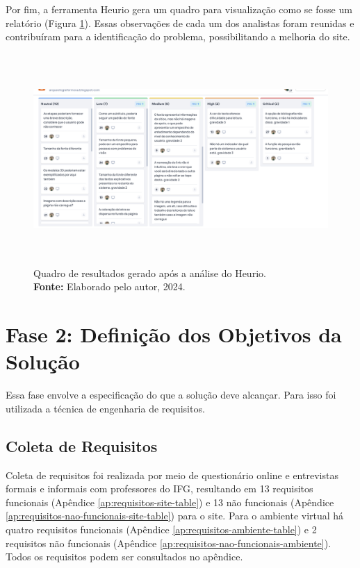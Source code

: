 Por fim, a ferramenta Heurio gera um quadro para visualização como se fosse um relatório (Figura \ref{fig:quadro resultados}). Essas observações de cada um dos analistas foram reunidas e contribuíram para a identificação do problema, possibilitando a melhoria do site. 
\begin{figure}[H]
    \centering
    \includegraphics[height=8cm, keepaspectratio]{img/heurio/quadro resultados.png}
    \caption{ Quadro de resultados gerado após a análise do Heurio. \\
        \textbf{Fonte:} Elaborado pelo autor, 2024.}
    \label{fig:quadro resultados}
\end{figure}


\section{Fase 2: Definição dos Objetivos da Solução}\label{definicao_dos_objetivos_da_solucao}
Essa fase envolve a especificação do que a solução deve alcançar. Para isso foi utilizada a técnica de engenharia de requisitos.
\subsection{Coleta de Requisitos}
Coleta de requisitos foi realizada por meio de questionário online e entrevistas formais e informais com professores do IFG, resultando em 13 requisitos funcionais (Apêndice \ref{ap:requisitos-site-table}) e 13 não funcionais (Apêndice \ref{ap:requisitos-nao-funcionais-site-table}) para o site. Para o ambiente virtual há quatro requisitos funcionais (Apêndice \ref{ap:requisitos-ambiente-table}) e 2 requisitos não funcionais (Apêndice \ref{ap:requisitos-nao-funcionais-ambiente}). Todos os requisitos podem ser consultados no apêndice. 

